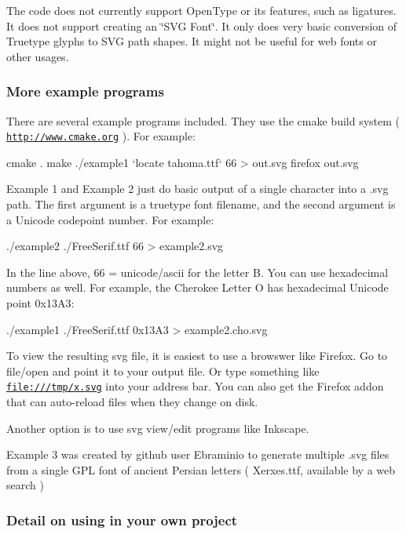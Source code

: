 The code does not currently support Open\+Type or it\textquotesingle{}s features, such as ligatures. It does not support creating an \char`\"{}\+S\+V\+G Font\char`\"{}. It only does very basic conversion of Truetype glyphs to S\+VG path shapes. It might not be useful for web fonts or other usages.

\subsubsection*{More example programs}

There are several example programs included. They use the cmake build system ( \href{http://www.cmake.org}{\tt http\+://www.\+cmake.\+org} ). For example\+: \begin{DoxyVerb} cmake .
 make
 ./example1 `locate tahoma.ttf` 66 > out.svg 
 firefox out.svg
\end{DoxyVerb}


Example 1 and Example 2 just do basic output of a single character into a .svg path. The first argument is a truetype font filename, and the second argument is a Unicode codepoint number. For example\+: \begin{DoxyVerb}./example2 ./FreeSerif.ttf 66 > example2.svg 
\end{DoxyVerb}


In the line above, 66 = unicode/ascii for the letter \textquotesingle{}B\textquotesingle{}. You can use hexadecimal numbers as well. For example, the Cherokee Letter O has hexadecimal Unicode point 0x13\+A3\+: \begin{DoxyVerb}./example1 ./FreeSerif.ttf 0x13A3 > example2.cho.svg
\end{DoxyVerb}


To view the resulting svg file, it is easiest to use a browswer like Firefox. Go to \textquotesingle{}file/open\textquotesingle{} and point it to your output file. Or type something like \textquotesingle{}\href{file:///tmp/x.svg'}{\tt file\+:///tmp/x.\+svg\textquotesingle{}} into your address bar. You can also get the Firefox addon that can auto-\/reload files when they change on disk.

Another option is to use svg view/edit programs like Inkscape.

Example 3 was created by github user Ebraminio to generate multiple .svg files from a single G\+PL font of ancient Persian letters ( Xerxes.\+ttf, available by a web search )

\subsubsection*{Detail on using in your own project}

